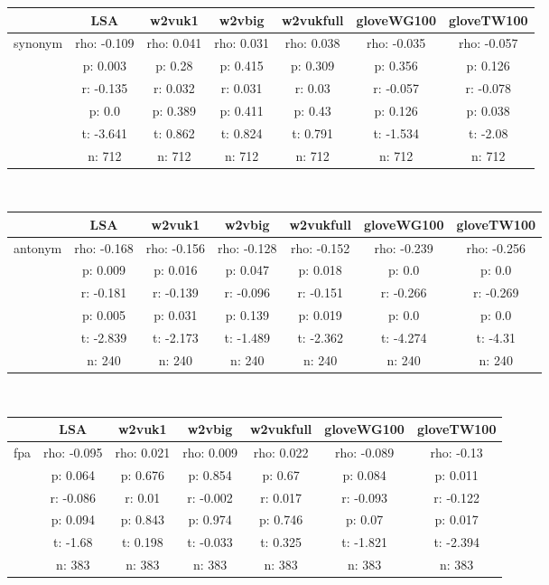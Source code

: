 \documentclass{article}
\begin{document}
\begin{tabular}{ccccccc|}\cline{2-7}
&\multicolumn{1}{|c}{LSA} & w2vuk1 & w2vbig & w2vukfull & gloveWG100 & gloveTW100 \\\hline
\multicolumn{1}{|c|}{\multirow{6}{*}{synonym}} & rho: -0.109 & rho: 0.041 & rho: 0.031 & rho: 0.038 & rho: -0.035 & rho: -0.057 \\
\multicolumn{1}{|c|}{} & p: 0.003 & p: 0.28 & p: 0.415 & p: 0.309 & p: 0.356 & p: 0.126 \\
\multicolumn{1}{|c|}{} & r: -0.135 & r: 0.032 & r: 0.031 & r: 0.03 & r: -0.057 & r: -0.078 \\
\multicolumn{1}{|c|}{} & p: 0.0 & p: 0.389 & p: 0.411 & p: 0.43 & p: 0.126 & p: 0.038 \\
\multicolumn{1}{|c|}{} & t: -3.641 & t: 0.862 & t: 0.824 & t: 0.791 & t: -1.534 & t: -2.08 \\
\multicolumn{1}{|c|}{} & n: 712 & n: 712 & n: 712 & n: 712 & n: 712 & n: 712 \\
\hline
\end{tabular}\\
\begin{tabular}{ccccccc|}\cline{2-7}
&\multicolumn{1}{|c}{LSA} & w2vuk1 & w2vbig & w2vukfull & gloveWG100 & gloveTW100 \\\hline
\multicolumn{1}{|c|}{\multirow{6}{*}{antonym}} & rho: -0.168 & rho: -0.156 & rho: -0.128 & rho: -0.152 & rho: -0.239 & rho: -0.256 \\
\multicolumn{1}{|c|}{} & p: 0.009 & p: 0.016 & p: 0.047 & p: 0.018 & p: 0.0 & p: 0.0 \\
\multicolumn{1}{|c|}{} & r: -0.181 & r: -0.139 & r: -0.096 & r: -0.151 & r: -0.266 & r: -0.269 \\
\multicolumn{1}{|c|}{} & p: 0.005 & p: 0.031 & p: 0.139 & p: 0.019 & p: 0.0 & p: 0.0 \\
\multicolumn{1}{|c|}{} & t: -2.839 & t: -2.173 & t: -1.489 & t: -2.362 & t: -4.274 & t: -4.31 \\
\multicolumn{1}{|c|}{} & n: 240 & n: 240 & n: 240 & n: 240 & n: 240 & n: 240 \\
\hline
\end{tabular}\\
\begin{tabular}{ccccccc|}\cline{2-7}
&\multicolumn{1}{|c}{LSA} & w2vuk1 & w2vbig & w2vukfull & gloveWG100 & gloveTW100 \\\hline
\multicolumn{1}{|c|}{\multirow{6}{*}{fpa}} & rho: -0.095 & rho: 0.021 & rho: 0.009 & rho: 0.022 & rho: -0.089 & rho: -0.13 \\
\multicolumn{1}{|c|}{} & p: 0.064 & p: 0.676 & p: 0.854 & p: 0.67 & p: 0.084 & p: 0.011 \\
\multicolumn{1}{|c|}{} & r: -0.086 & r: 0.01 & r: -0.002 & r: 0.017 & r: -0.093 & r: -0.122 \\
\multicolumn{1}{|c|}{} & p: 0.094 & p: 0.843 & p: 0.974 & p: 0.746 & p: 0.07 & p: 0.017 \\
\multicolumn{1}{|c|}{} & t: -1.68 & t: 0.198 & t: -0.033 & t: 0.325 & t: -1.821 & t: -2.394 \\
\multicolumn{1}{|c|}{} & n: 383 & n: 383 & n: 383 & n: 383 & n: 383 & n: 383 \\
\hline
\end{tabular}\\
\end{document}
